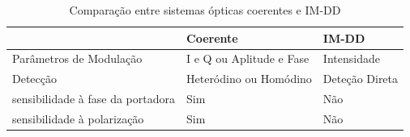 \begin{table}[!htb]
    \centering
    \caption[Coerente Vs IM-DD]{Comparação entre  sistemas ópticas coerentes  e  IM-DD \label{tab:compara}}
    \begin{tabular}{lll}
        \toprule
            & Coerente & IM-DD  \\
        \midrule
           Parâmetros de Modulação & I e Q ou Aplitude e Fase & Intensidade  \\
           Detecção & Heteródino ou Homódino & Deteção Direta \\
           sensibilidade à fase da portadora & Sim & Não \\
          sensibilidade à polarização & Sim &Não  \\
        \bottomrule
    \end{tabular}
\end{table}
